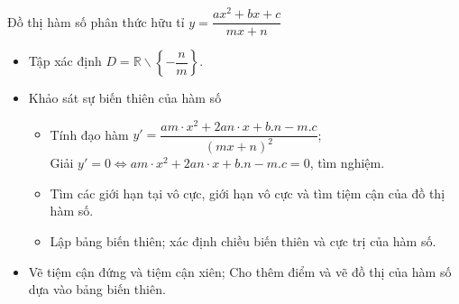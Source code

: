 \begin{dang}{Đồ thị hàm số phân thức hữu tỉ $y=\dfrac{ax^2+bx+c}{mx+n}$}
	\begin{itemize}
		\item[\iconCH]  Tập xác định $D=\mathbb{R}\backslash \left\{-\dfrac{n}{m}\right\}$.
		\item [\iconCH]  Khảo sát sự biến thiên của hàm số
		\begin{itemize}
			\item Tính đạo hàm $y'=\dfrac{am\cdot x^2+2an\cdot x + b.n - m.c}{(mx+n)^2}$;\\
			 Giải $y'=0 \Leftrightarrow am\cdot x^2+2an\cdot x + b.n - m.c=0$, tìm nghiệm.
			\item Tìm các giới hạn tại vô cực, giới hạn vô cực và tìm tiệm cận của đồ thị hàm số.
			\item Lập bảng biến thiên; xác định chiều biến thiên và cực trị của hàm số.
		\end{itemize}
		\item [\iconCH]  Vẽ tiệm cận đứng và tiệm cận xiên; Cho thêm điểm và vẽ đồ thị của hàm số dựa vào bảng biến thiên.
	\end{itemize}
\end{dang}
